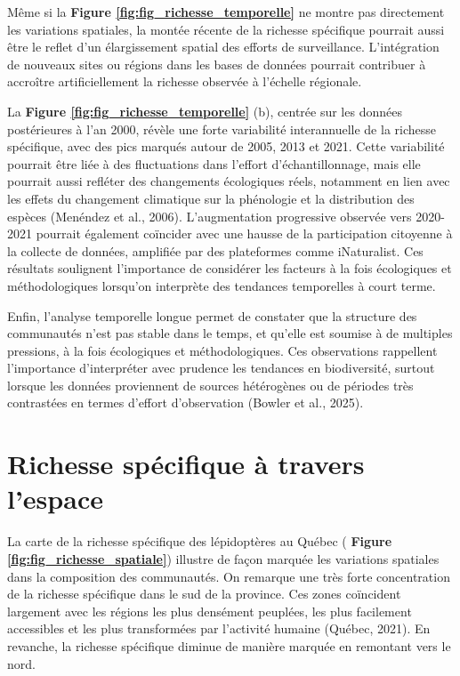 \documentclass[9pt,twocolumn,twoside,]{pnas-new}
\begin{document}
Même si la \textbf{Figure \ref{fig:fig_richesse_temporelle}} ne montre
pas directement les variations spatiales, la montée récente de la
richesse spécifique pourrait aussi être le reflet d'un élargissement
spatial des efforts de surveillance. L'intégration de nouveaux sites ou
régions dans les bases de données pourrait contribuer à accroître
artificiellement la richesse observée à l'échelle régionale.

La \textbf{Figure \ref{fig:fig_richesse_temporelle}} (b), centrée sur
les données postérieures à l'an 2000, révèle une forte variabilité
interannuelle de la richesse spécifique, avec des pics marqués autour de
2005, 2013 et 2021. Cette variabilité pourrait être liée à des
fluctuations dans l'effort d'échantillonnage, mais elle pourrait aussi
refléter des changements écologiques réels, notamment en lien avec les
effets du changement climatique sur la phénologie et la distribution des
espèces (Menéndez et al., 2006). L'augmentation progressive observée
vers 2020-2021 pourrait également coïncider avec une hausse de la
participation citoyenne à la collecte de données, amplifiée par des
plateformes comme iNaturalist. Ces résultats soulignent l'importance de
considérer les facteurs à la fois écologiques et méthodologiques
lorsqu'on interprète des tendances temporelles à court terme.

Enfin, l'analyse temporelle longue permet de constater que la structure
des communautés n'est pas stable dans le temps, et qu'elle est soumise à
de multiples pressions, à la fois écologiques et méthodologiques. Ces
observations rappellent l'importance d'interpréter avec prudence les
tendances en biodiversité, surtout lorsque les données proviennent de
sources hétérogènes ou de périodes très contrastées en termes d'effort
d'observation (Bowler et al., 2025).

\section*{Richesse spécifique à travers
l'espace}\label{richesse-spuxe9cifique-uxe0-travers-lespace}

La carte de la richesse spécifique des lépidoptères au Québec (
\textbf{Figure \ref{fig:fig_richesse_spatiale}}) illustre de façon
marquée les variations spatiales dans la composition des communautés. On
remarque une très forte concentration de la richesse spécifique dans le
sud de la province. Ces zones coïncident largement avec les régions les
plus densément peuplées, les plus facilement accessibles et les plus
transformées par l'activité humaine (Québec, 2021). En revanche, la
richesse spécifique diminue de manière marquée en remontant vers le
nord.
\end{document}
